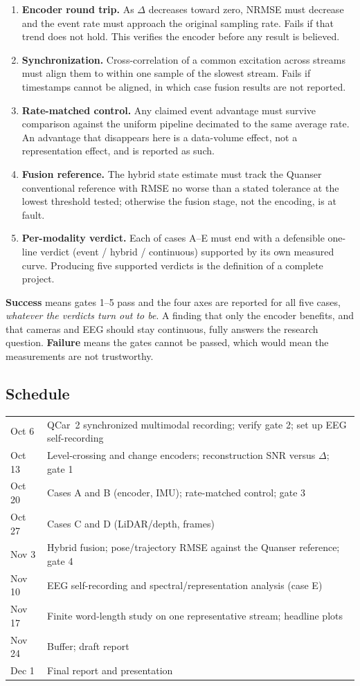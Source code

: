 \documentclass[11pt,a4paper]{article}
\begin{document}
\begin{enumerate}
\item \textbf{Encoder round trip.} As $\Delta$ decreases toward zero, NRMSE must
decrease and the event rate must approach the original sampling rate. Fails if that
trend does not hold. This verifies the encoder before any result is believed.
\item \textbf{Synchronization.} Cross-correlation of a common excitation across streams
must align them to within one sample of the slowest stream. Fails if timestamps cannot
be aligned, in which case fusion results are not reported.
\item \textbf{Rate-matched control.} Any claimed event advantage must survive comparison
against the uniform pipeline decimated to the same average rate. An advantage that
disappears here is a data-volume effect, not a representation effect, and is reported as
such.
\item \textbf{Fusion reference.} The hybrid state estimate must track the Quanser
conventional reference with RMSE no worse than a stated tolerance at the lowest
threshold tested; otherwise the fusion stage, not the encoding, is at fault.
\item \textbf{Per-modality verdict.} Each of cases A--E must end with a defensible
one-line verdict (event / hybrid / continuous) supported by its own measured curve.
Producing five supported verdicts is the definition of a complete project.
\end{enumerate}

\textbf{Success} means gates 1--5 pass and the four axes are reported for all five
cases, \emph{whatever the verdicts turn out to be}. A finding that only the encoder
benefits, and that cameras and EEG should stay continuous, fully answers the research
question. \textbf{Failure} means the gates cannot be passed, which would mean the
measurements are not trustworthy.

\subsection{Schedule}

\begin{tabularx}{\linewidth}{@{}lX@{}}
\hline
Oct 6 & QCar~2 synchronized multimodal recording; verify gate 2; set up EEG self-recording \\
Oct 13 & Level-crossing and change encoders; reconstruction SNR versus $\Delta$; gate 1 \\
Oct 20 & Cases A and B (encoder, IMU); rate-matched control; gate 3 \\
Oct 27 & Cases C and D (LiDAR/depth, frames) \\
Nov 3 & Hybrid fusion; pose/trajectory RMSE against the Quanser reference; gate 4 \\
Nov 10 & EEG self-recording and spectral/representation analysis (case E) \\
Nov 17 & Finite word-length study on one representative stream; headline plots \\
Nov 24 & Buffer; draft report \\
Dec 1 & Final report and presentation \\
\hline
\end{tabularx}
\end{document}
